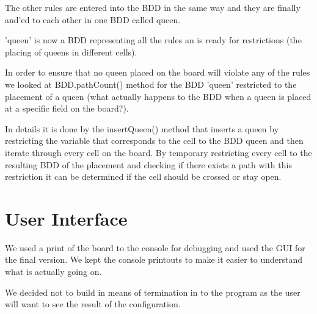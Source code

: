 The other rules are entered into the BDD in the same way and they are finally and'ed to each other in one BDD called queen.

'queen' is now a BDD representing all the rules an is ready for restrictions (the placing of queens in different cells).

In order to ensure that no queen placed on the board will violate any of the rules we looked at BDD.pathCount() method for the BDD 'queen' restricted to the placement of a queen (what actually happens to the BDD when a queen is placed at a specific field on the board?). 

In details it is done by the insertQueen() method that inserts a queen by restricting the variable that corresponds to the cell to the BDD queen and then iterate through every cell on the board. By temporary restricting every cell to the resulting BDD of the placement and checking if there exists a path with this restriction it can be determined if the cell should be crossed or stay open.


\section{User Interface}

We used a print of the board to the console for debugging and used the GUI for the final version. We kept the console printouts to make it easier to understand what is actually going on. 
 
We decided not to build in means of termination in to the program as the user will want to see the result of the configuration.



